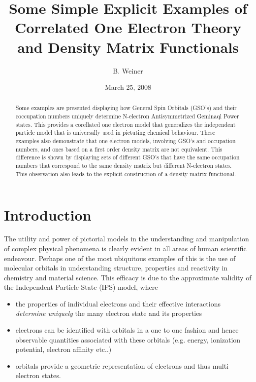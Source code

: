 \documentclass[aps,preprint]{revtex4}%
\begin{document}
\preprint{ }
\title{Some Simple Explicit Examples of Correlated One Electron Theory and Density
Matrix Functionals }
\author{B. Weiner}

\pacs{}

\begin{abstract}
Some examples are presented displaying how General Spin Orbitals (GSO's) and
their coccupation numbers uniquely determine N-electron Antisymmetrized
Geminaql Power states. This provides a corellated one electron model that
generalizes the independent particle model that is universally used in
pictuting chemical behaviour. These examples also demonstrate that one
electron models, involving GSO's and occupation numbers, and ones based on a
first order density matrix are not equivalent.  This difference is shown by
displaying sets of different GSO's that have the same occupation numbers that
correspond to the same density matrix but different N-electron states. This
observation also leads to the explicit construction of a density matrix functional.

\end{abstract}
\date{March 25, 2008}
\maketitle
\tableofcontents


\section{Introduction\label{Intro}}

The utility and power of pictorial models in the understanding and
manipulation of complex physical phenomena is clearly evident in all areas of
human scientific endeavour. Perhaps one of the most ubiquitous examples of
this is the use of molecular orbitals in understanding structure, properties
and reactivity in chemistry and material science. This efficacy is due to the
approximate validity of the Independent Particle State (IPS) model, where

\begin{itemize}
\item the properties of individual electrons and their effective interactions
\emph{determine uniquely} the many electron state and its properties

\item electrons can be identified with orbitals in a one to one fashion and
hence observable quantities associated with these orbitals (e.g. energy,
ionization potential, electron affinity etc..)

\item orbitals provide a geometric representation of electrons and thus multi
electron states.
\end{itemize}
\end{document}
